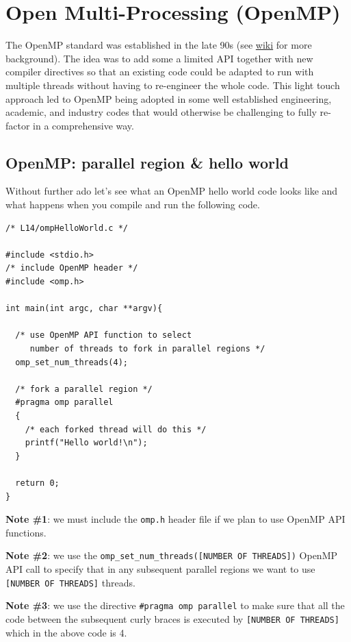 \section{Open Multi-Processing (OpenMP)}

The OpenMP standard was established in the late 90s (see \href{https://en.wikipedia.org/wiki/OpenMP#History}{wiki} for more background). The idea was to add some a limited API together with new compiler directives so that an existing code could be adapted to run with multiple threads without having to re-engineer the whole code. This light touch approach led to OpenMP being adopted in some well established engineering, academic, and industry codes that would otherwise be challenging to fully re-factor in a comprehensive way. 

\subsection{OpenMP: parallel region \& hello world}

Without further ado let's see what an OpenMP hello world code looks like and what happens when you compile and run the following code.

\begin{verbatim}
/* L14/ompHelloWorld.c */

#include <stdio.h> 
/* include OpenMP header */
#include <omp.h>

int main(int argc, char **argv){

  /* use OpenMP API function to select 
     number of threads to fork in parallel regions */
  omp_set_num_threads(4);
  
  /* fork a parallel region */
  #pragma omp parallel   
  {
    /* each forked thread will do this */
    printf("Hello world!\n");
  }
  
  return 0;
}
\end{verbatim}

{\bf Note \#1}: we must include the \texttt{omp.h} header file if we plan to use OpenMP API functions.

{\bf Note \#2}: we use the \texttt{omp\_set\_num\_threads([NUMBER OF THREADS])} OpenMP API call to specify that in any subsequent parallel regions we want to use \texttt{[NUMBER OF THREADS]} threads.

{\bf Note \#3}: we use the directive \texttt{\#pragma omp parallel} to make sure that all the code between the subsequent curly braces is executed by \texttt{[NUMBER OF THREADS]} which in the above code is 4.

